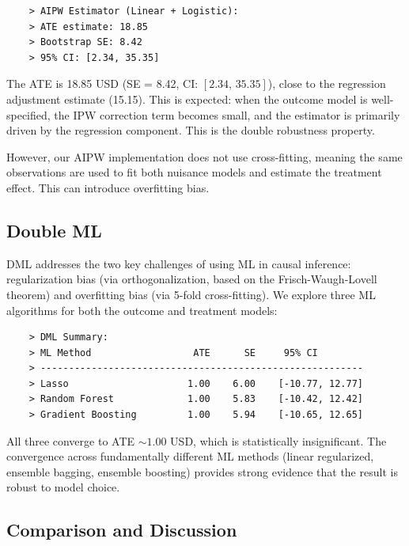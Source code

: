 \documentclass[10pt]{article}
\begin{document}
\begin{verbatim}
    > AIPW Estimator (Linear + Logistic):
    > ATE estimate: 18.85
    > Bootstrap SE: 8.42
    > 95% CI: [2.34, 35.35]
\end{verbatim}

The ATE is 18.85 USD (SE = 8.42, CI: $[2.34,\, 35.35] $), close to the regression adjustment estimate (15.15). This is expected: when the outcome model is well-specified, the IPW correction term becomes small, and the estimator is primarily driven by the regression component. This is the double robustness property. 

However, our AIPW implementation does not use cross-fitting, meaning the same observations are used to fit both nuisance models and estimate the treatment effect. This can introduce overfitting bias. 

\subsection{Double ML}

DML addresses the two key challenges of using ML in causal inference: regularization bias (via orthogonalization, based on the Frisch-Waugh-Lovell theorem) and overfitting bias (via 5-fold cross-fitting). We explore three ML algorithms for both the outcome and treatment models: 

\begin{verbatim}
    > DML Summary:
    > ML Method                  ATE      SE     95% CI
    > ---------------------------------------------------------
    > Lasso                     1.00    6.00    [-10.77, 12.77]
    > Random Forest             1.00    5.83    [-10.42, 12.42]
    > Gradient Boosting         1.00    5.94    [-10.65, 12.65]
\end{verbatim}

All three converge to ATE $\sim 1.00 $ USD, which is statistically insignificant. The convergence across fundamentally different ML methods (linear regularized, ensemble bagging, ensemble boosting) provides strong evidence that the result is robust to model choice. 

\subsection{Comparison and Discussion}
\end{document}
